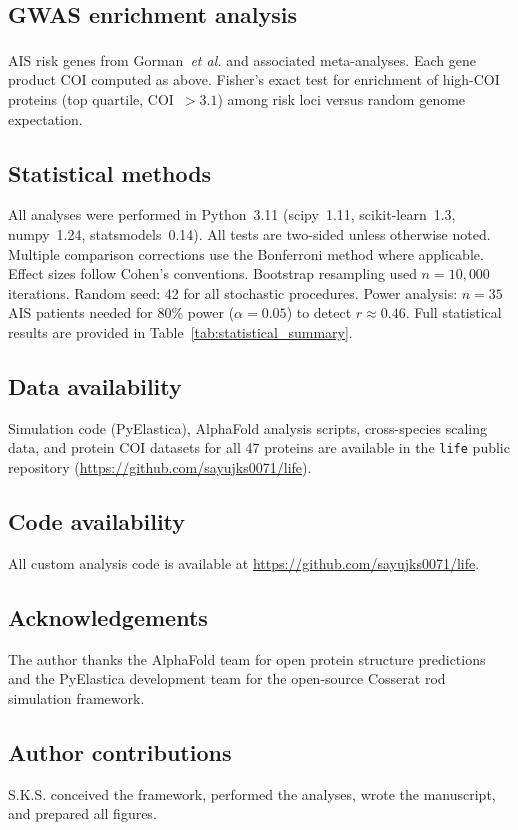 \documentclass[12pt]{article}
\begin{document}
\subsection*{GWAS enrichment analysis}
AIS risk genes from Gorman~\textit{et al.}\textsuperscript{\cite{gorman2022}} and associated meta-analyses. Each gene product COI computed as above. Fisher's exact test for enrichment of high-COI proteins (top quartile, COI~$> 3.1$) among risk loci versus random genome expectation.

\subsection*{Statistical methods}
All analyses were performed in Python~3.11 (scipy~1.11, scikit-learn~1.3, numpy~1.24, statsmodels~0.14). All tests are two-sided unless otherwise noted. Multiple comparison corrections use the Bonferroni method where applicable. Effect sizes follow Cohen's conventions. Bootstrap resampling used $n = 10{,}000$ iterations. Random seed: 42 for all stochastic procedures. Power analysis: $n = 35$ AIS patients needed for 80\% power ($\alpha = 0.05$) to detect $r \approx 0.46$. Full statistical results are provided in Table~\ref{tab:statistical_summary}.

\subsection*{Data availability}
Simulation code (PyElastica), AlphaFold analysis scripts, cross-species scaling data, and protein COI datasets for all 47 proteins are available in the \texttt{life} public repository (\url{https://github.com/sayujks0071/life}).

\subsection*{Code availability}
All custom analysis code is available at \url{https://github.com/sayujks0071/life}.

\subsection*{Acknowledgements}
The author thanks the AlphaFold team for open protein structure predictions and the PyElastica development team for the open-source Cosserat rod simulation framework.

\subsection*{Author contributions}
S.K.S. conceived the framework, performed the analyses, wrote the manuscript, and prepared all figures.
\end{document}
